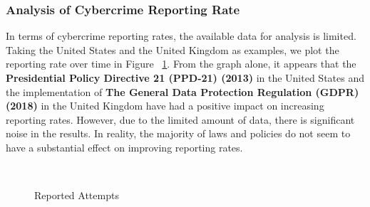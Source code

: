     \subsubsection*{Analysis of Cybercrime Reporting Rate} %
        In terms of cybercrime reporting rates, the available data for analysis is limited.
        Taking the United States and the United Kingdom as examples, we plot the reporting rate over time in Figure
        ~\ref{fig:reported-attempts}.
        From the graph alone, it appears that
        the \textbf{Presidential Policy Directive 21 (PPD-21) (2013)} in the United States and
        the implementation of \textbf{The General Data Protection Regulation (GDPR) (2018)}
        in the United Kingdom have had a positive impact on increasing reporting rates.
        However, due to the limited amount of data, there is significant noise in the results.
        In reality, the majority of laws and policies do not seem to have a substantial effect on improving reporting rates.
        \begin{figure}[htb]
            \centering
            \hfill
            \\
            \caption{Reported Attempts}\label{fig:reported-attempts}
        \end{figure}

